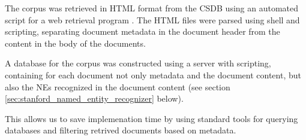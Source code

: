 The corpus was retrieved in HTML format from the CSDB using an automated script for a web retrieval program \cite{wget}. The HTML files were parsed using shell and \citeauthor{python} scripting, separating document metadata in the document header from the content in the body of the documents.

A database for the corpus was constructed using a \citeauthor{MySQL} server with \citeauthor{perl} scripting, containing for each document not only metadata and the document content, but also the NEs recognized in the document content (see section \ref{sec:stanford_named_entity_recognizer} below).

This allows us to save implemenation time by using standard tools for querying databases and filtering retrived documents based on metadata. 
